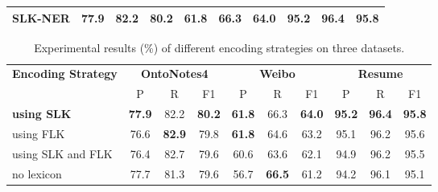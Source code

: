 \documentclass[conference]{IEEEtran}
\begin{document}
\begin{table*}[h]
\begin{tabular}{
|l|c|c|c|
            c|c|c|
            c|c|c|}
        \hline


\textbf{SLK-NER} 
            & 77.9	&\textbf{82.2}	&\textbf{80.2}
            & 61.8	& 66.3              &\textbf{64.0}
            & 95.2	&\textbf{96.4}	&\textbf{95.8}
\\
        \hline
\end{tabular}
\end{table*}
    
    
    
    \begin{table*}[htbp]
            \caption{Experimental results (\%) of different encoding strategies on three datasets.}\label{result2}
\centering
\begin{tabular} {|l|
                c|c|c|
                c|c|c|
                c|c|c|
}
            \hline
            \multicolumn{1}{|c|}{\multirow{2}{*}{\textbf{Encoding Strategy}}} 
            & \multicolumn{3}{|c|}{\textbf{OntoNotes4}}  
            & \multicolumn{3}{|c|}{\textbf{Weibo}}  
            &\multicolumn{3}{|c|}{\textbf{Resume}}       
\\
            \cline{2-10}
            \multicolumn{1}{|c|}{}  
            & \multicolumn{1}{|c|}{ P }  & \multicolumn{1}{|c|}{ R } & \multicolumn{1}{|c|}{ F1 } 
            & \multicolumn{1}{|c|}{ P } & \multicolumn{1}{|c|}{ R } & \multicolumn{1}{|c|}{ F1 } 
            & \multicolumn{1}{|c|}{ P } & \multicolumn{1}{|c|}{ R } & \multicolumn{1}{|c|}{ F1 } 
\\
            \hline
            \textbf{using SLK} 
                & \textbf{ 77.9 } 	  &82.2 	&\textbf{ 80.2 }
                & \textbf{ 61.8 }     &66.3 	&\textbf{ 64.0 }
                & \textbf{ 95.2 }     &\textbf{ 96.4 } 	&\textbf{ 95.8 }  
\\
            using FLK
                &76.6 	       &\textbf{ 82.9 } 	&79.8 
                &\textbf{ 61.8 } &	64.6 	&63.2 
                &95.1 	       &96.2 	&95.6   
\\
            {using SLK and FLK} 
                & 76.4  	  &82.7 	&79.6
                & 60.6 &63.6&62.1
                &94.9 & 96.2 &95.5  
\\
            no lexicon
                &77.7 	&81.3 	&79.6 
                &56.7 	&\textbf{ 66.5 } 	&61.2 
                & 94.2 	&96.1 	&95.1
\\
            \hline
            \end{tabular}
\end{table*}
        
\end{document}
